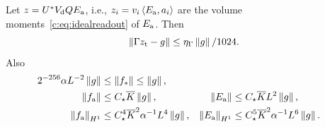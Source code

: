 \begin{lemma}
\label{c:lem:auxrecovery}
Let $z=U^*V_{\rm d}QE_{\rm a}$, i.e., $z_i=v_i\left\langle E_{\rm a},a_i\right\rangle$ are the
volume moments~\eqref{c:eq:idealreadout} of $E_{\rm a}$. Then
\begin{equation}
 \left\lVert \Gamma z_{\rm t}-g\right\rVert\le\eta_\Gamma\left\lVert g\right\rVert/1024.                  \label{c:eq:auxlogical}
\end{equation}
Also
\begin{align}
 2^{-256}\alpha L^{-2}\left\lVert g\right\rVert&\le\left\lVert f_*\right\rVert\le\left\lVert g\right\rVert,\\
 \left\lVert f_{\rm a}\right\rVert&\le C_\star \overline K\left\lVert g\right\rVert,
 &\left\lVert E_{\rm a}\right\rVert&\le C_\star \overline KL^2\left\lVert g\right\rVert,\\
 \left\lVert f_{\rm a}\right\rVert_{H^1}&\le C_\star^4\overline K^2\alpha^{-1}L^4\left\lVert g\right\rVert,
 &\left\lVert E_{\rm a}\right\rVert_{H^1}&\le C_\star^5\overline K^2\alpha^{-1}L^6\left\lVert g\right\rVert.
                                                               \label{c:eq:auxnorms}
\end{align}
\end{lemma}

